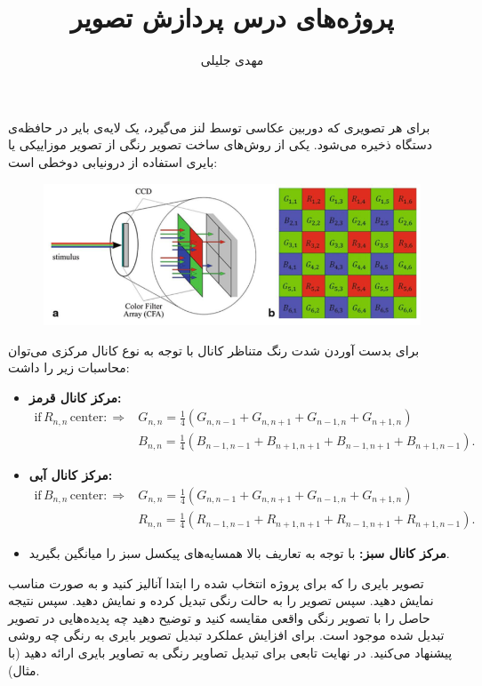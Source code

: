 \documentclass[11pt,professionalfonts]{article}
\title{پروژه‌های درس پردازش تصویر}
\author{مهدی جلیلی}
\begin{document}
	\maketitle
	
	\begin{center}
	\end{center}
	
	
	برای هر تصویری که دوربین عکاسی توسط لنز می‌گیرد، یک لایه‌ی بایر 
	در حافظه‌ی دستگاه ذخیره می‌شود. یکی از روش‌های ساخت تصویر رنگی
	از تصویر موزاییکی یا بایری استفاده از درونیابی دوخطی است:
	\begin{figure}[H]
		\centering
		\includegraphics[width=0.95\linewidth]{Files/Bayer.png}
		\label{fig:bayer}
	\end{figure}
	برای بدست آوردن شدت رنگ متناظر کانال با توجه به نوع کانال مرکزی می‌توان محاسبات زیر را داشت:
	
	\begin{itemize}
		\item 
		\textbf{مرکز کانال قرمز:}
		\begin{align*}
			\text{if}\, R_{n,n}\, \text{center}:\Rightarrow &G_{n,n} = \frac{1}{4}(G_{n,n-1}+G_{n,n+1}+G_{n-1,n}+G_{n+1,n})\\
			& B_{n,n} = \frac{1}{4}(B_{n-1,n-1}+B_{n+1,n+1}+B_{n-1,n+1}+B_{n+1,n-1}).
		\end{align*}
		\item 
		\textbf{مرکز کانال آبی:}
		\begin{align*}
			\text{if}\, B_{n,n}\, \text{center}:\Rightarrow &G_{n,n} = \frac{1}{4}(G_{n,n-1}+G_{n,n+1}+G_{n-1,n}+G_{n+1,n})\\
			& R_{n,n} = \frac{1}{4}(R_{n-1,n-1}+R_{n+1,n+1}+R_{n-1,n+1}+R_{n+1,n-1}).
		\end{align*}
		\item 
		\textbf{مرکز کانال سبز:}
		با توجه به تعاریف بالا همسایه‌های پیکسل سبز را میانگین بگیرید.
	\end{itemize}
	تصویر بایری را که برای پروژه انتخاب شده را ابتدا آنالیز کنید و به صورت مناسب نمایش دهید. سپس تصویر را به حالت رنگی تبدیل کرده و نمایش دهید. سپس نتیجه حاصل را با تصویر رنگی واقعی مقایسه کنید و توضیح دهید چه پدیده‌هایی در تصویر تبدیل شده موجود است. برای افزایش عملکرد تبدیل تصویر بایری به رنگی چه روشی پیشنهاد می‌کنید. در نهایت تابعی برای تبدیل تصاویر رنگی به تصاویر بایری ارائه دهید (با مثال).
	
\end{document}
